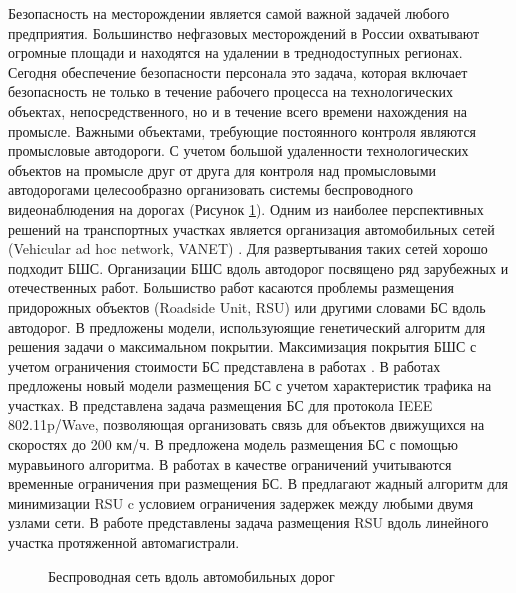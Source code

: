 Безопасность на месторождении является самой важной задачей любого предприятия. Большинство нефгазовых месторождений в России охватывают огромные площади и находятся на удалении в треднодоступных регионах. Сегодня обеспечение безопасности персонала это задача, которая включает безопасность не только в течение рабочего процесса на технологических объектах, непосредственного, но и в течение всего времени нахождения на промысле. Важными объектами, требующие постоянного контроля являются промысловые автодороги. С учетом большой удаленности технологических объектов на промысле друг от друга для контроля над промысловыми автодорогами целесообразно организовать системы беспроводного видеонаблюдения на дорогах \cite{Vish2015} (Рисунок \ref{fig:part2_roadisdeunit}). Одним из наиболее перспективных решений на транспортных участках является организация автомобильных сетей (Vehicular ad hoc network, VANET) \cite{Massobrio2020, Campolo2015}. Для развертывания таких сетей хорошо подходит БШС. Организации БШС вдоль автодорог посвящено ряд зарубежных и отечественных работ. Большиство работ касаются проблемы размещения придорожных объектов (Roadside Unit, RSU) или другими словами БС вдоль автодорог. В \cite{Cavalcante2012, KHireddine2020} предложены модели, используюящие генетический алгоритм для решения задачи о максимальном покрытии. Максимизация покрытия БШС с учетом ограничения стоимости БС представлена в работах \cite{BenBrahim2014, Vishnevsky2016_optimization}. В работах \cite{Liu2014, Gao2018, Jalooli2019} предложены новый модели размещения БС с учетом характеристик трафика на участках. В \cite{Reis2014} представлена задача размещения БС для протокола IEEE 802.11p/Wave, позволяющая организовать связь для объектов движущихся на скоростях до 200 км/ч.   В \cite{Guerna2021} предложена модель размещения БС с помощью муравьиного алгоритма. В работах \cite{Cavalcante2012, Liu2017} в качестве ограничений учитываются временные ограничения при размещения БС. В \cite{Bao2018} предлагают жадный алгоритм для минимизации RSU c условием ограничения задержек между любыми двумя узлами сети. В работе \cite{Ivanov2018} представлены задача размещения RSU вдоль линейного участка протяженной автомагистрали. 

\begin{figure}[ht]
  \caption{Беспроводная сеть вдоль автомобильных дорог}\label{fig:part2_roadisdeunit}
\end{figure}



